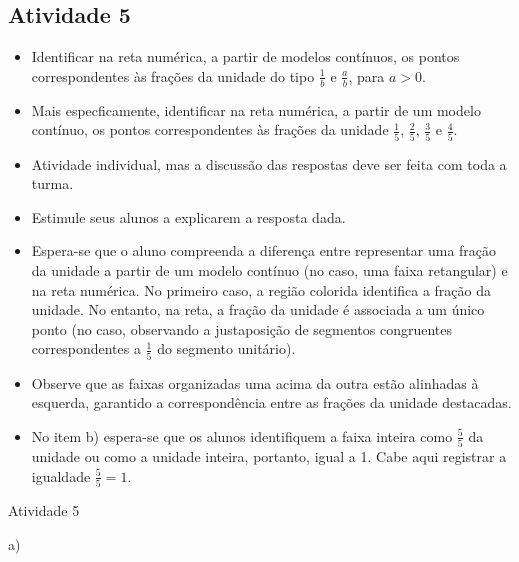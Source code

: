 \begin{multicols}{2}
\subsection{Atividade 5}

\begin{itemize} %
    \item       Identificar na reta numérica, a partir de modelos contínuos, os pontos correspondentes às frações da unidade do tipo       $\frac{1}{b}$       e       $\frac{a}{b}$, para       $a>0$.
    \item       Mais especficamente, identificar na reta numérica, a partir de um modelo contínuo, os pontos correspondentes às frações da unidade       $\frac{1}{5}$,       $\frac{2}{5}$,       $\frac{3}{5}$       e       $\frac{4}{5}$.
\end{itemize} %
  
      
\begin{itemize} %
    \item       Atividade individual, mas a discussão das respostas deve ser feita com toda a turma.
    \item       Estimule seus alunos a explicarem a resposta dada.  
    \item       Espera-se que o aluno compreenda a diferença entre representar uma fração da unidade a partir de um modelo contínuo (no caso, uma faixa retangular) e na reta numérica. No primeiro caso, a região colorida identifica a fração da unidade. No entanto, na reta, a fração da unidade é associada a um único ponto (no caso, observando a justaposição de segmentos congruentes correspondentes a       $\frac{1}{5}$       do segmento unitário). 
    \item       Observe que as faixas organizadas uma acima da outra estão alinhadas à esquerda, garantido a correspondência entre as frações da unidade destacadas. 
    \item       No item b) espera-se que os alunos identifiquem a faixa inteira como       $\frac{5}{5}$       da unidade ou como a unidade inteira, portanto, igual a 1. Cabe aqui registrar a igualdade       $\frac{5}{5}=1$. 
\end{itemize} %
  

\begin{resposta*}{Atividade 5}

\noindent a)
\begin{center}
\end{center}
\end{resposta*}
\end{multicols}
